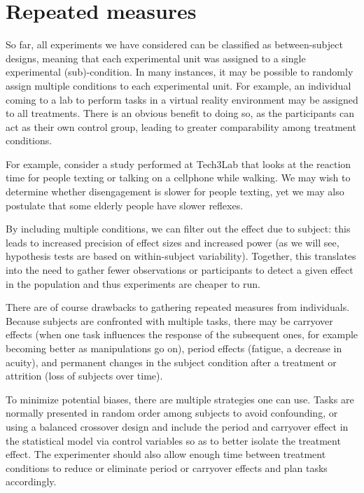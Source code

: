 \documentclass[
  11pt,
  letterpaper,
]{scrbook}
\theoremstyle{definition}
\theoremstyle{definition}
\theoremstyle{remark}
\begin{document}

\chapter{Repeated measures}\label{repeated-measures}

So far, all experiments we have considered can be classified as
between-subject designs, meaning that each experimental unit was
assigned to a single experimental (sub)-condition. In many instances, it
may be possible to randomly assign multiple conditions to each
experimental unit. For example, an individual coming to a lab to perform
tasks in a virtual reality environment may be assigned to all
treatments. There is an obvious benefit to doing so, as the participants
can act as their own control group, leading to greater comparability
among treatment conditions.

For example, consider a study performed at Tech3Lab that looks at the
reaction time for people texting or talking on a cellphone while
walking. We may wish to determine whether disengagement is slower for
people texting, yet we may also postulate that some elderly people have
slower reflexes.

By including multiple conditions, we can filter out the effect due to
subject: this leads to increased precision of effect sizes and increased
power (as we will see, hypothesis tests are based on within-subject
variability). Together, this translates into the need to gather fewer
observations or participants to detect a given effect in the population
and thus experiments are cheaper to run.

There are of course drawbacks to gathering repeated measures from
individuals. Because subjects are confronted with multiple tasks, there
may be carryover effects (when one task influences the response of the
subsequent ones, for example becoming better as manipulations go on),
period effects (fatigue, a decrease in acuity), and permanent changes in
the subject condition after a treatment or attrition (loss of subjects
over time).

To minimize potential biases, there are multiple strategies one can use.
Tasks are normally presented in random order among subjects to avoid
confounding, or using a balanced crossover design and include the period
and carryover effect in the statistical model via control variables so
as to better isolate the treatment effect. The experimenter should also
allow enough time between treatment conditions to reduce or eliminate
period or carryover effects and plan tasks accordingly.
\end{document}
